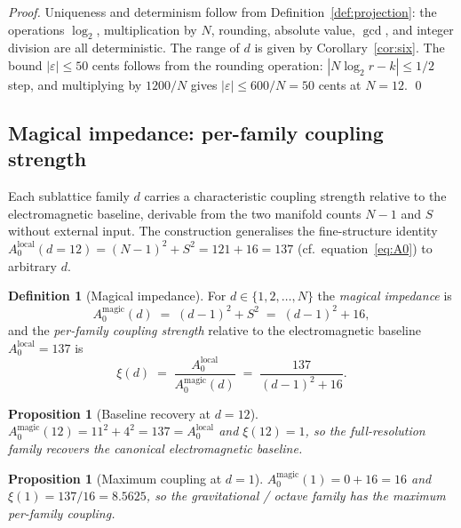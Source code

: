 \documentclass[11pt,a4paper]{article}
\newtheorem{proposition}[theorem]{Proposition}
\theoremstyle{definition}
\newtheorem{definition}[theorem]{Definition}
\theoremstyle{remark}
\newcommand{\eps}{\varepsilon}
\begin{document}
\begin{proof}
Uniqueness and determinism follow from Definition~\ref{def:projection}: the operations $\log_{2}$, multiplication by $N$, rounding, absolute value, $\gcd$, and integer division are all deterministic. The range of $d$ is given by Corollary~\ref{cor:six}. The bound $|\eps|\le 50$ cents follows from the rounding operation: $|N\log_{2}r - k|\le 1/2$ step, and multiplying by $1200/N$ gives $|\eps|\le 600/N=50$ cents at $N=12$. \qed
\end{proof}

\subsection{Magical impedance: per-family coupling strength}\label{subsec:impedance}

Each sublattice family $d$ carries a characteristic coupling strength relative to the electromagnetic baseline, derivable from the two manifold counts $N{-}1$ and $S$ without external input. The construction generalises the fine-structure identity $A_{0}^{\text{local}}(d{=}12) = (N{-}1)^{2}+S^{2} = 121+16 = 137$ (cf.\ equation~\eqref{eq:A0}) to arbitrary $d$.

\begin{definition}[Magical impedance]\label{def:magical-impedance}
For $d\in\{1,2,\ldots,N\}$ the \emph{magical impedance} is
\[
A_{0}^{\text{magic}}(d) \;=\; (d-1)^{2} + S^{2} \;=\; (d-1)^{2} + 16,
\]
and the \emph{per-family coupling strength} relative to the electromagnetic baseline $A_{0}^{\text{local}} = 137$ is
\[
\xi(d) \;=\; \frac{A_{0}^{\text{local}}}{A_{0}^{\text{magic}}(d)} \;=\; \frac{137}{(d-1)^{2}+16}.
\]
\end{definition}

\begin{proposition}[Baseline recovery at $d=12$]\label{prop:baseline}
$A_{0}^{\text{magic}}(12) = 11^{2}+4^{2} = 137 = A_{0}^{\text{local}}$ and $\xi(12) = 1$, so the full-resolution family recovers the canonical electromagnetic baseline.
\end{proposition}

\begin{proposition}[Maximum coupling at $d=1$]\label{prop:max-coupling}
$A_{0}^{\text{magic}}(1) = 0 + 16 = 16$ and $\xi(1) = 137/16 = 8.5625$, so the gravitational / octave family has the maximum per-family coupling.
\end{proposition}
\end{document}
